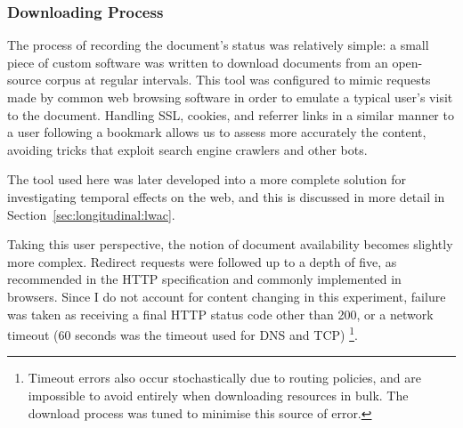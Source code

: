 








\subsubsection{Downloading Process}
The process of recording the document's status was relatively simple: a small piece of custom software was written to download documents from an open-source corpus at regular intervals.  This tool was configured to mimic requests made by common web browsing software in order to emulate a typical user's visit to the document. Handling SSL, cookies, and referrer links in a similar manner to a user following a bookmark allows us to assess more accurately the content, avoiding tricks that exploit search engine crawlers and other bots.

The tool used here was later developed into a more complete solution for investigating temporal effects on the web, and this is discussed in more detail in Section~\ref{sec:longitudinal:lwac}.




Taking this user perspective, the notion of document availability becomes slightly more complex.  Redirect requests were followed up to a depth of five, as recommended in the HTTP specification and commonly implemented in browsers.  Since I do not account for content changing in this experiment, failure was taken as receiving a final HTTP status code other than 200, or a network timeout (60 seconds was the timeout used for DNS and TCP)%
\footnote{Timeout errors also occur stochastically due to routing policies, and are impossible to avoid entirely when downloading resources in bulk.  The download process was tuned to minimise this source of error.}.

